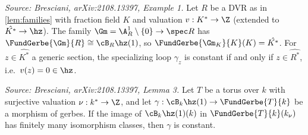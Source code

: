 \begin{example}[GmLoop]
  \label{example:gm-loop}
  \textit{Source: Bresciani, arXiv:2108.13397, Example 1.}
  Let \(R\) be a DVR as in \cref{lem:families} with fraction field \(K\) and
  valuation \(v : K^* \to \Z\) (extended to \(\hat{K^*} \to \hz\)). The family
  \(\Gm = \A^1_R \setminus \{0\} \to \spec R\) has
  \(\FundGerbe{\Gm}{R} \cong \cB_R \hz(1)\), so
  \(\FundGerbe{\Gm_K}{K}(K) = \hat{K^*}\). For \(z \in \hat{K^*}\) a generic
  section, the specializing loop \(\gamma_z\) is constant if and only if
  \(z \in \hat{R^*}\), i.e.\ \(v(z) = 0 \in \hz\).
\end{example}

\begin{lemma}[UniqueLoopTorus]
  \label{lem:unique-loop-torus}
  \textit{Source: Bresciani, arXiv:2108.13397, Lemma 3.}
  Let \(T\) be a torus over \(k\) with surjective valuation \(\nu : k^* \to \Z\),
  and let \(\gamma : \cB_k \hz(1) \to \FundGerbe{T}{k}\) be a morphism of gerbes.
  If the image of \(\cB_k \hz(1)(k)\) in \(\FundGerbe{T}{k}(k_\nu)\) has finitely
  many isomorphism classes, then \(\gamma\) is constant.
\end{lemma}

